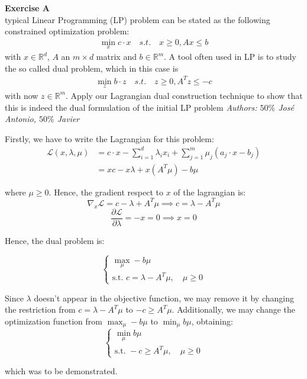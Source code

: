 \documentclass[11pt,table]{article}
\newenvironment{problem}[2][Exercise]
{ \begin{mdframed}[backgroundcolor=gray!20] \textbf{#1 #2} \\}
	{\hspace{0.0cm}\newline\newline \emph{Authors: \(50\%\) José Antonio, \(50\%\) Javier}  \end{mdframed}}
\newcommand\R{\mathbb R}
\begin{document}
	\begin{problem}{8}
		A typical Linear Programming (LP) problem can be stated as the following constrained optimization problem:
		\begin{align*}
			\min_x c \cdot x \quad s.t. \quad x \geq 0, Ax \leq b
		\end{align*}
		with \(x \in \R^d\), \(A\) an \(m \times d\) matrix and \(b \in \R^m\). A tool often used in LP is to study the so called dual problem, which in this case is
		\begin{align*}
			\min_{z} b \cdot z \quad s.t. \quad z \geq 0, A^T z \leq -c
		\end{align*}
		with now \(z \in \R^m\). Apply our Lagrangian dual construction technique to show that this is indeed the dual formulation of the initial LP problem
	\end{problem}
	
	Firstly, we have to write the Lagrangian for this problem:
	\begin{align*}
		\mathcal L(x,\lambda,\mu) & = c \cdot x -  \sum_{i=1}^d \lambda_i x_i  + \sum_{j=1}^m \mu_j(a_j \cdot x - b_j) \\
		& = xc - x\lambda + x\left(A^T \mu\right) - b\mu
	\end{align*}
	
	where $\mu \ge 0$. Hence, the gradient respect to \(x\) of the lagrangian is:
	\[
	\nabla_x \mathcal L = c - \lambda + A^T \mu \implies c = \lambda - A^T\mu
	\]
	\[
	\frac{\partial \mathcal L}{\partial \lambda} = -x = 0 \implies x = 0
	\]
	
	Hence, the dual problem is:
	
	\[
	\begin{cases}
		\max_\mu - b \mu \\
		\text{s.t. } c = \lambda - A^T\mu, \quad \mu \ge 0
	\end{cases}
	\]
	
	Since $\lambda$ doesn't appear in the objective function, we may remove it by changing the restriction from $c = \lambda - A^T\mu$ to $-c \geq A^T\mu$. Additionally, we may change the optimization function from $\max_\mu - b \mu$ to $\min_\mu b \mu$, obtaining:
	\[
	\begin{cases}
		\min_\mu b \mu \\
		\text{s.t. } -c \ge A^T\mu, \quad \mu \ge 0
	\end{cases}
	\]
	
	which was to be demonstrated. \\
	
\end{document}
